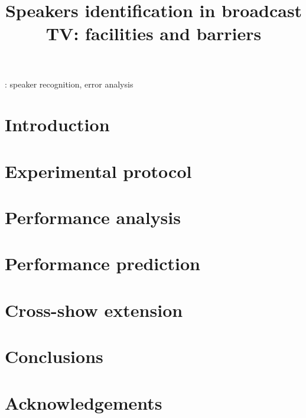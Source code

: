 \documentclass[a4paper]{article}
\title{Speakers identification in broadcast TV: facilities and barriers}
\begin{document}
\maketitle

\begin{abstract}

\end{abstract}

: speaker recognition, error analysis


\section{Introduction}
\label{sec:introduction}


\section{Experimental protocol}
\label{sec:protocol}


\section{Performance analysis}
\label{sec:analysis}


\section{Performance prediction}
\label{sec:prediction}


\section{Cross-show extension}
\label{sec:xshow}


\section{Conclusions}
\label{sec:conclusion}


\section{Acknowledgements}


\newpage
\eightpt



\end{document}
